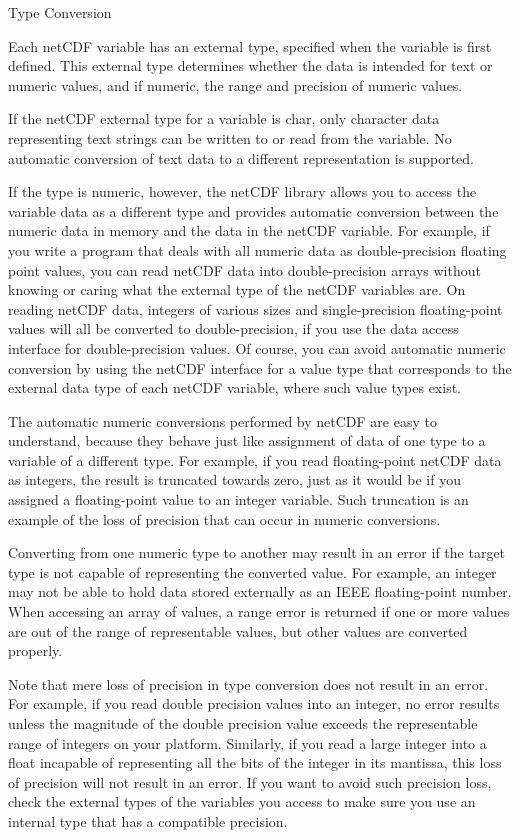 \begin{framed}

Type Conversion

Each netCDF variable has an external type, specified when the variable is first defined. This external type determines whether the data is intended for text or numeric values, and if numeric, the range and precision of numeric values.

If the netCDF external type for a variable is char, only character data representing text strings can be written to or read from the variable. No automatic conversion of text data to a different representation is supported.

If the type is numeric, however, the netCDF library allows you to access the variable data as a different type and provides automatic conversion between the numeric data in memory and the data in the netCDF variable. For example, if you write a program that deals with all numeric data as double-precision floating point values, you can read netCDF data into double-precision arrays without knowing or caring what the external type of the netCDF variables are. On reading netCDF data, integers of various sizes and single-precision floating-point values will all be converted to double-precision, if you use the data access interface for double-precision values. Of course, you can avoid automatic numeric conversion by using the netCDF interface for a value type that corresponds to the external data type of each netCDF variable, where such value types exist.

The automatic numeric conversions performed by netCDF are easy to understand, because they behave just like assignment of data of one type to a variable of a different type. For example, if you read floating-point netCDF data as integers, the result is truncated towards zero, just as it would be if you assigned a floating-point value to an integer variable. Such truncation is an example of the loss of precision that can occur in numeric conversions.

Converting from one numeric type to another may result in an error if the target type is not capable of representing the converted value. For example, an integer may not be able to hold data stored externally as an IEEE floating-point number. When accessing an array of values, a range error is returned if one or more values are out of the range of representable values, but other values are converted properly.

Note that mere loss of precision in type conversion does not result in an error. For example, if you read double precision values into an integer, no error results unless the magnitude of the double precision value exceeds the representable range of integers on your platform. Similarly, if you read a large integer into a float incapable of representing all the bits of the integer in its mantissa, this loss of precision will not result in an error. If you want to avoid such precision loss, check the external types of the variables you access to make sure you use an internal type that has a compatible precision.


\end{framed}
